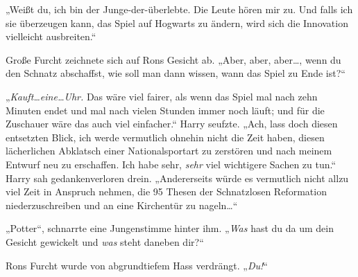 „Weißt du, ich bin der Junge-der-überlebte. Die Leute hören mir zu. Und falls ich sie überzeugen kann, das Spiel auf Hogwarts zu ändern, wird sich die Innovation vielleicht ausbreiten.“

Große Furcht zeichnete sich auf Rons Gesicht ab. „Aber, aber, aber…, wenn du den Schnatz abschaffst, wie soll man dann wissen, wann das Spiel zu Ende ist?“

„\emph{Kauft…eine…Uhr.} Das wäre viel fairer, als wenn das Spiel mal nach zehn Minuten endet und mal nach vielen Stunden immer noch läuft; und für die Zuschauer wäre das auch viel einfacher.“ Harry seufzte. „Ach, lass doch diesen entsetzten Blick, ich werde vermutlich ohnehin nicht die Zeit haben, diesen lächerlichen Abklatsch einer Nationalsportart zu zerstören und nach meinem Entwurf neu zu erschaffen. Ich habe sehr, \emph{sehr} viel wichtigere Sachen zu tun.“ Harry sah gedankenverloren drein. „Andererseits würde es vermutlich nicht allzu viel Zeit in Anspruch nehmen, die 95 Thesen der Schnatzlosen Reformation niederzuschreiben und an eine Kirchentür zu nageln…“

„Potter“, schnarrte eine Jungenstimme hinter ihm. „\emph{Was} hast du da um dein Gesicht gewickelt und \emph{was} steht daneben dir?“

Rons Furcht wurde von abgrundtiefem Hass verdrängt. „\emph{Du!}“

